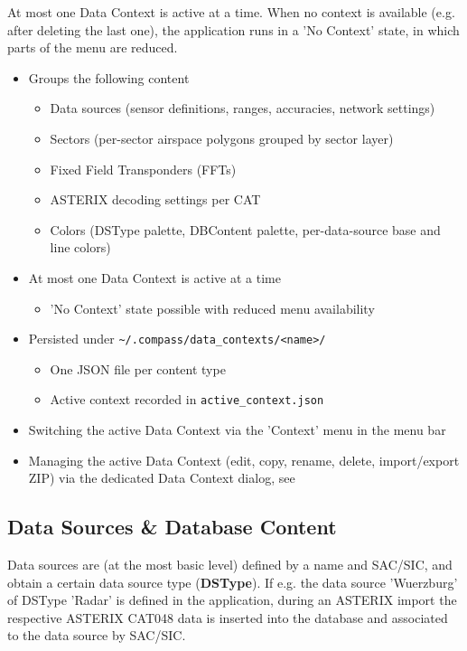 At most one Data Context is active at a time. When no context is available (e.g. after deleting the last one), the application runs in a 'No Context' state, in which parts of the menu are reduced. \\

\begin{itemize}
\item Groups the following content
\begin{itemize}
\item Data sources (sensor definitions, ranges, accuracies, network settings)
\item Sectors (per-sector airspace polygons grouped by sector layer)
\item Fixed Field Transponders (FFTs)
\item ASTERIX decoding settings per CAT
\item Colors (DSType palette, DBContent palette, per-data-source base and line colors)
\end{itemize}
\item At most one Data Context is active at a time
\begin{itemize}
\item 'No Context' state possible with reduced menu availability
\end{itemize}
\item Persisted under \texttt{\textasciitilde/.compass/data\_contexts/<name>/}
\begin{itemize}
\item One JSON file per content type
\item Active context recorded in \texttt{active\_context.json}
\end{itemize}
\item Switching the active Data Context via the 'Context' menu in the menu bar
\item Managing the active Data Context (edit, copy, rename, delete, import/export ZIP) via the dedicated Data Context dialog, see 
\end{itemize}

\subsection*{Data Sources \& Database Content}

Data sources are (at the most basic level) defined by a name and SAC/SIC, and obtain a certain data source type (\textbf{DSType}). 
If e.g. the data source 'Wuerzburg' of DSType 'Radar' is defined in the application, during an ASTERIX import the respective ASTERIX CAT048 data is inserted into the database and associated to the data source by SAC/SIC. \\

